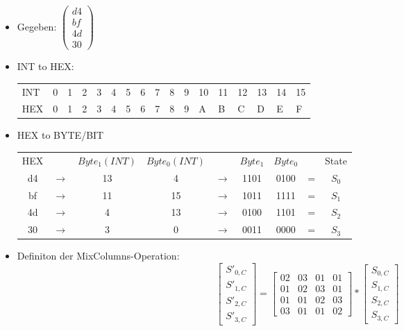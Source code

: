  \begin{itemize}
     \item Gegeben: $\begin{pmatrix}
                        d4\\
                        bf\\
                        4d\\
                        30
                    \end{pmatrix}$
     \item INT to HEX:
     \begin{center}
\begin{tabular}{lllllllllllllllll}
INT & 0 & 1 & 2 & 3 & 4 & 5 & 6 & 7 & 8 & 9 & 10 & 11 & 12 & 13 & 14 & 15\\
HEX & 0 & 1 & 2 & 3 & 4 & 5 & 6 & 7 & 8 & 9 & A & B & C & D & E & F
     \end{tabular}
     \end{center}

     \item HEX to BYTE/BIT
     \begin{center}
\begin{tabular}{ccccccccc}
HEX &  & $Byte_1 (INT)$ & $Byte_0 (INT)$ &  & $Byte_1$ & $Byte_0$ &  & State\\
d4 & $\rightarrow$ & 13 & 4 & $\rightarrow$ & 1101 & 0100 & = & $S_0$\\
bf & $\rightarrow$ & 11 & 15 & $\rightarrow$ & 1011 & 1111 & = & $S_1$\\
4d & $\rightarrow$ & 4 & 13 & $\rightarrow$ & 0100 & 1101 & = & $S_2$\\
30 & $\rightarrow$ & 3 & 0 & $\rightarrow$ & 0011 & 0000 & = & $S_3$
     \end{tabular}
     \end{center}

     \item Definiton der MixColumns-Operation:
     \begin{equation}
         \begin{bmatrix}
             S'_{0,C}\\
             S'_{1,C}\\
             S'_{2,C}\\
             S'_{3,C}
         \end{bmatrix}
         =
         \begin{bmatrix}
             02 & 03 & 01 & 01\\
             01 & 02 & 03 & 01\\
             01 & 01 & 02 & 03\\
             03 & 01 & 01 & 02
         \end{bmatrix}
         *
         \begin{bmatrix}
             S_{0,C}\\
             S_{1,C}\\
             S_{2,C}\\
             S_{3,C}
         \end{bmatrix}
     \end{equation}


\end{itemize}
